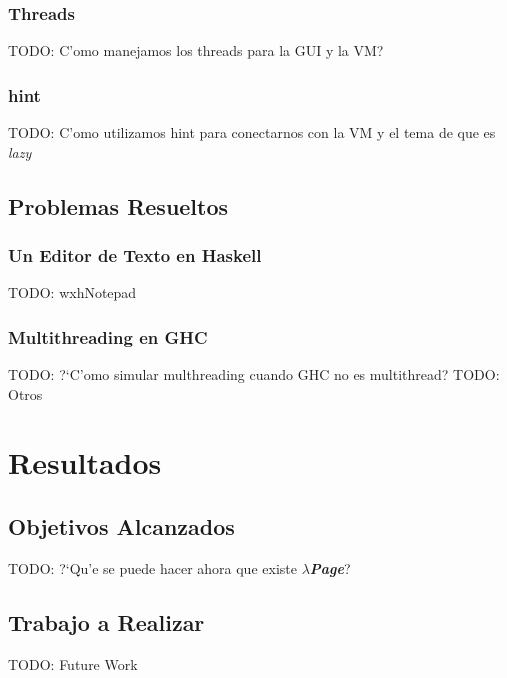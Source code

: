 \documentclass[a4paper]{article}
\newcommand{\hpage}{\textbf{\textsl{$\lambda$Page}}}
\begin{document}
\subsubsection{Threads}TODO: C'omo manejamos los threads para la GUI y la VM?
\subsubsection{hint}TODO: C'omo utilizamos hint para conectarnos con la VM y el tema de que es \textsl{lazy}
\subsection{Problemas Resueltos}
\subsubsection{Un Editor de Texto en Haskell}TODO: wxhNotepad
\subsubsection{Multithreading en GHC}TODO: ?`C'omo simular multhreading cuando GHC no es multithread?
TODO: Otros

\section{Resultados}
\subsection{Objetivos Alcanzados}TODO: ?`Qu'e se puede hacer ahora que existe \hpage?
\subsection{Trabajo a Realizar} TODO: Future Work


\end{document}
